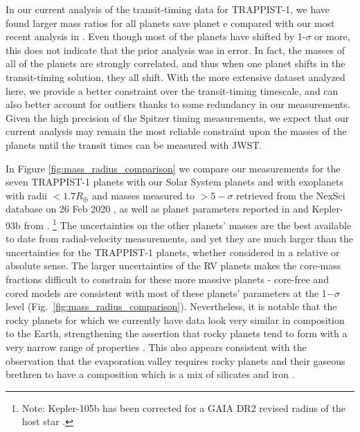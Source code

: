 \documentclass[fleqn,usenatbib]{mnras} %
\begin{document}
In our current analysis of the transit-timing data
for TRAPPIST-1, we have found larger mass ratios for
all planets save planet e compared with our most
recent analysis in \citet{Grimm2018}.  Even though
most of the planets have shifted by 1-$\sigma$ or more,
this does not indicate that the prior analysis was in
error.  In fact, the masses of all of the planets
are strongly correlated, and thus when one planet shifts
in the transit-timing solution, they all shift.  With
the more extensive dataset analyzed here, we provide
a better constraint over the transit-timing timescale,
and can also better account for outliers thanks to some
redundancy in our measurements. Given the high precision of
the Spitzer timing measurements, we expect that our current 
analysis may remain the most reliable constraint upon the 
masses of the planets until the transit times can be measured 
with JWST.




In Figure \ref{fig:mass_radius_comparison} we compare our measurements for
the seven TRAPPIST-1 planets with our Solar System planets and with exoplanets
with radii ${<}1.7 R_\oplus$ and masses measured to ${>}5-\sigma$ retrieved from
the NexSci database on 26 Feb 2020 \citep{Akeson2013,Christiansen2018}, as well
as planet parameters reported in \citet{Dai2019} and Kepler-93b from \citet{Dressing2015}.
\footnote{Note: Kepler-105b has been corrected for a GAIA DR2 revised radius of
    the host star \citep{Berger2018,Fulton2018}.}   The uncertainties
on the other planets' masses are the best available to date from radial-velocity measurements, and yet they are much larger than the uncertainties for the TRAPPIST-1 planets, whether considered in
a relative or absolute sense.  The larger uncertainties of the RV planets makes the core-mass fractions difficult to constrain
for these more massive planets - core-free and cored models are consistent with most of these planets' parameters at the 1$-\sigma$ level (Fig.\ \ref{fig:mass_radius_comparison}).   Nevertheless, it is notable that the
rocky planets for which we currently have data look very similar in composition to the
Earth, strengthening the assertion that rocky planets tend to form with a very
narrow range of properties \citep{Dressing2015}.
This also appears consistent with the observation
that the evaporation valley requires rocky planets and their gaseous brethren to have 
a composition which is a mix of silicates and iron \citep{Owen2017}.
\end{document}
